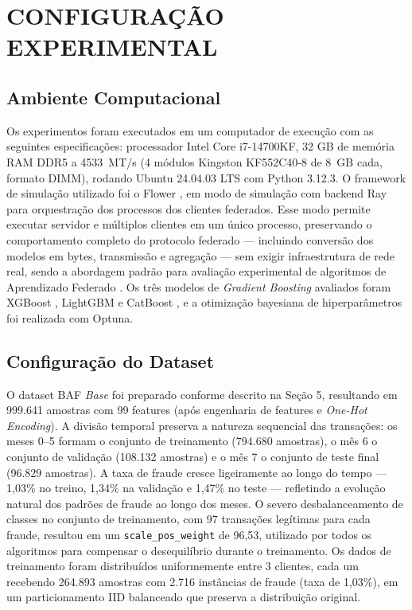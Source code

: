 \section{CONFIGURAÇÃO EXPERIMENTAL}

\subsection{Ambiente Computacional}
\label{sec:ambiente_computacional}

Os experimentos foram executados em um computador de execução com as seguintes especificações: processador Intel Core i7-14700KF, 32 GB de memória RAM DDR5 a 4533~MT/s (4 módulos Kingston KF552C40-8 de 8~GB cada, formato DIMM), rodando Ubuntu 24.04.03 LTS com Python 3.12.3. O framework de simulação utilizado foi o Flower \cite{flower2020}, em modo de simulação com backend Ray para orquestração dos processos dos clientes federados. Esse modo permite executar servidor e múltiplos clientes em um único processo, preservando o comportamento completo do protocolo federado --- incluindo conversão dos modelos em bytes, transmissão e agregação --- sem exigir infraestrutura de rede real, sendo a abordagem padrão para avaliação experimental de algoritmos de Aprendizado Federado \cite{flower2020}. Os três modelos de \textit{Gradient Boosting} avaliados foram XGBoost \cite{chen2016xgboost}, LightGBM \cite{ke2017lightgbm} e CatBoost \cite{prokhorenkova2018catboost}, e a otimização bayesiana de hiperparâmetros foi realizada com Optuna.

\subsection{Configuração do Dataset}

O dataset BAF \textit{Base} \cite{jesus2022baf} foi preparado conforme descrito na Seção 5, resultando em 999.641 amostras com 99 features (após engenharia de features e \textit{One-Hot Encoding}). A divisão temporal preserva a natureza sequencial das transações: os meses 0--5 formam o conjunto de treinamento (794.680 amostras), o mês 6 o conjunto de validação (108.132 amostras) e o mês 7 o conjunto de teste final (96.829 amostras). A taxa de fraude cresce ligeiramente ao longo do tempo --- 1,03\% no treino, 1,34\% na validação e 1,47\% no teste --- refletindo a evolução natural dos padrões de fraude ao longo dos meses. O severo desbalanceamento de classes no conjunto de treinamento, com 97 transações legítimas para cada fraude, resultou em um \texttt{scale\_pos\_weight} de 96,53, utilizado por todos os algoritmos para compensar o desequilíbrio durante o treinamento. Os dados de treinamento foram distribuídos uniformemente entre 3 clientes, cada um recebendo 264.893 amostras com 2.716 instâncias de fraude (taxa de 1,03\%), em um particionamento IID balanceado que preserva a distribuição original.

